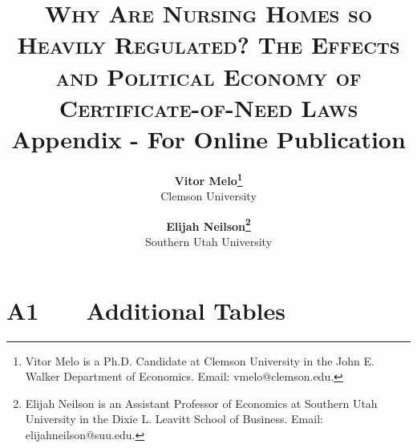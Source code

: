\documentclass[12pt]{article}
\renewcommand*\thetable{\Roman{table}}
\begin{document}

\title{\textsc{Why Are Nursing Homes so Heavily Regulated? The Effects and Political Economy of Certificate-of-Need Laws}\\
	$~$\\
	$~$\\
	Appendix - For Online Publication
	$~$\\
    $~$\\}



\author{\textbf{Vitor Melo\protect\thanks{Vitor Melo is a Ph.D. Candidate at Clemson University in the John E. Walker Department of Economics. Email: vmelo@clemson.edu.}} \\ Clemson University
\and
\textbf{Elijah Neilson\protect\thanks{Elijah Neilson is an Assistant Professor of Economics at Southern Utah University in the Dixie L. Leavitt School of Business. Email: elijahneilson@suu.edu.}} \\ Southern Utah University
  	}		

\date{}              %





\renewcommand{\thefootnote}{\fnsymbol{footnote}}

\singlespacing

\maketitle

\medskip


\clearpage

\onehalfspacing
\setcounter{footnote}{0}
\renewcommand{\thefootnote}{\arabic{footnote}}



\section*{A1 \ \ \ Additional Tables}
\vspace{.5cm}

\setcounter{table}{0}
\renewcommand{\thetable}{A\Roman{table}}
\end{document}
